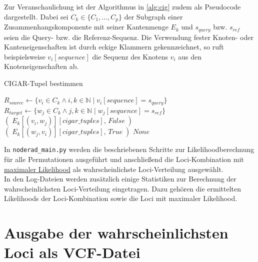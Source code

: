 Zur Veranschaulichung ist der Algorithmus in \ref{alg:cig} zudem als Pseudocode dargestellt. Dabei sei $ C_{k} \in \{C_{1}, \dots ,C_{p}\} $ der Subgraph einer Zusammenhangskomponente mit seiner Kantenmenge $ E_{k} $ und $ s_{query} $ bzw. $ s_{ref} $ seien die Query- bzw. die Referenz-Sequenz. Die Verwendung fester Knoten- oder Kanteneigenschaften ist durch eckige Klammern gekennzeichnet, so ruft beispielsweise $v_{i}[sequence]$ die Sequenz des Knotens $v_{i}$ aus den Knoteneigenschaften ab. \\

\begin{algorithm}[H]
	\caption{CIGAR-Tupel bestimmen}  \label{alg:cig}
	\begin{algorithmic}[1]	
		\State $ R_{source} \gets \{v_{i} \in C_{k} \wedge i,k \in \mathds{N} \; |\; v_{i}[sequence]= s_{query} \}$
		\State $ R_{target} \gets \{w_{j} \in C_{k} \wedge j,k \in \mathds{N} \; |\; w_{j}[sequence]= s_{ref} \}$
		\State \Return $ (\;E_{k}[(v_{i}, w_{j})][cigar\_tuples],\, False\;) $		    
		\EndIf
		\State \Return $ (\;E_{k}[(w_{j}, v_{i})][cigar\_tuples],\, True\;) $		
		\EndIf
		\EndFor
		\EndFor
		\State \Return $ None $
		\EndFunction
	\end{algorithmic}
\end{algorithm}

In \lstinline|noderad_main.py| werden die beschriebenen Schritte zur Likelihoodberechnung für alle Permutationen ausgeführt und anschließend die Loci-Kombination mit \hyperref[schritt17]{maximaler Likelihood\label{schritt17txt}} als wahrscheinlichste Loci-Verteilung ausgewählt.\\

In den Log-Dateien werden zusätzlich einige Statistiken zur Berechnung der wahrscheinlichsten Loci-Verteilung eingetragen. Dazu gehören die ermittelten Likelihoods der Loci-Kombination sowie die Loci mit maximaler Likelihood. \\

\section{Ausgabe der wahrscheinlichsten Loci als VCF-Datei} \label{sec:vcf}

